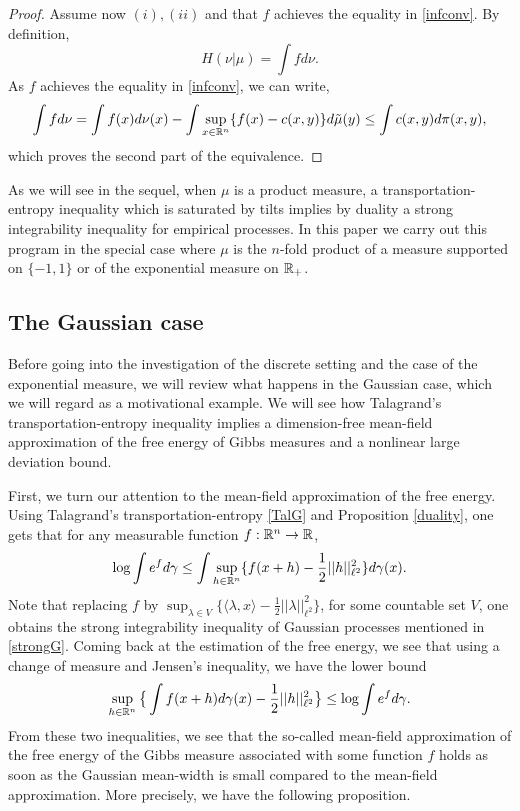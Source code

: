 \documentclass[a4paper,oneside,11pt]{article}
\begin{document}
\begin{proof}
Assume now $(i), (ii)$ and that $f$ achieves the equality in \eqref{infconv}. By definition,
$$H(\nu| \mu) = \int f d\nu.$$
As $f$ achieves the equality in \eqref{infconv}, we can write,
$$  \int f d\nu = \int f(x) d\nu(x)  - \int \sup_{x\in \mathbb{R}^n}\{ f(x) - c(x,y)\} d\tilde \mu(y) \leq \int c(x,y) d\pi(x,y),$$
which proves the second part of the equivalence.
\end{proof}

 As we will see in the sequel, when $\mu$ is a product measure, a transportation-entropy inequality which is saturated by tilts implies by duality a strong integrability inequality for empirical processes.  In this paper we carry out this program in the special case where $\mu$ is the $n$-fold product of a measure supported on $\{-1,1\}$ or of the exponential measure on $\mathbb{R}_+$.

\subsection{The Gaussian case}\label{Gaussian}
Before going into the investigation of the discrete setting and the case of the exponential measure, we will review what happens in the Gaussian case, which we will regard as a motivational example. We will see how Talagrand's transportation-entropy inequality \cite{Talagrand2} implies a dimension-free mean-field approximation of the free energy of Gibbs measures and a nonlinear large deviation bound.




First, we turn our attention to the mean-field approximation of the free energy. Using Talagrand's transportation-entropy \eqref{TalG} and Proposition \ref{duality}, one gets  that for any measurable function $f : \mathbb{R}^n \to \mathbb{R}$,
\begin{equation} \label{infconvG} \log \int e^f d\gamma \leq \int \sup_{h \in \mathbb{R}^n} \{ f(x+h) - \frac{1}{2}||h||_{\ell^2}^2 \}  d\gamma(x).\end{equation}
Note that replacing $f$ by $\sup_{\lambda \in V} \{\langle \lambda, x\rangle - \frac{1}{2}||\lambda||_{\ell^2}^2\}$, for some countable set $V$, one obtains the strong integrability inequality of Gaussian processes mentioned in \eqref{strongG}. Coming back at the estimation of the free energy, we see that using a change of measure and Jensen's inequality, we have the lower bound
$$ \sup_{h\in \mathbb{R}^n} \big\{ \int f(x+h) d\gamma(x) - \frac{1}{2}||h||_{\ell^2}^2\big \} \leq \log \int e^f d\gamma.$$
From these two inequalities, we see that the so-called mean-field approximation of the free energy of the Gibbs measure associated with some function $f$ holds as soon as the Gaussian mean-width is small compared to the mean-field approximation. More precisely, we have the following proposition.
\end{document}
